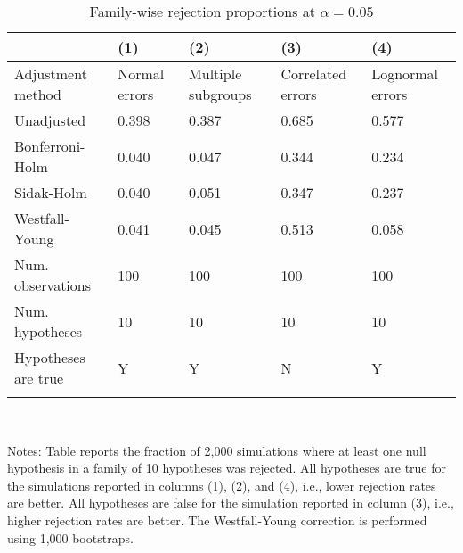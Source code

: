 \documentclass{article}
\begin{document}
\begin{table}[tbp] \centering
{}

\caption{Family-wise rejection proportions at \(\alpha = 0.05\)}
\label{tab:wyoung1}
\begin{tabularx}{\linewidth}{@{}lCCCC@{}}

\toprule
&{(1)}&{(2)}&{(3)}&{(4)} \tabularnewline \midrule
{Adjustment method}&{Normal errors}&{Multiple subgroups}&{Correlated errors}&{Lognormal errors} \tabularnewline
\midrule \addlinespace[\belowrulesep]
Unadjusted&0.398&0.387&0.685&0.577 \tabularnewline
Bonferroni-Holm&0.040&0.047&0.344&0.234 \tabularnewline
Sidak-Holm&0.040&0.051&0.347&0.237 \tabularnewline
Westfall-Young&0.041&0.045&0.513&0.058 \tabularnewline
\midrule Num. observations&100&100&100&100 \tabularnewline
Num. hypotheses&10&10&10&10 \tabularnewline
Hypotheses are true&Y&Y&N&Y \tabularnewline
\bottomrule \addlinespace[\belowrulesep]

\end{tabularx}
\\ \parbox{\linewidth}{\footnotesize Notes: Table reports the fraction of 2,000 simulations where at least one null hypothesis in a family of 10 hypotheses was rejected. All hypotheses are true for the simulations reported in columns (1), (2), and (4), i.e., lower rejection rates are better. All hypotheses are false for the simulation reported in column (3), i.e., higher rejection rates are better. The Westfall-Young correction is performed using 1,000 bootstraps.}
\end{table}
\end{document}
